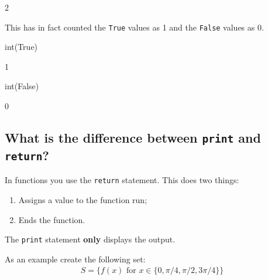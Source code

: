 \begin{raw}
2
\end{raw}





This has in fact counted the \texttt{True} values as 1 and the \texttt{False} values as 0.




\begin{pyin}
int(True)
\end{pyin}





\begin{raw}
1
\end{raw}







\begin{pyin}
int(False)
\end{pyin}





\begin{raw}
0
\end{raw}





\subsection{What is the difference between \texttt{print} and \texttt{return}?}
\label{\detokenize{tools-for-mathematics/06-probability/why/main:what-is-the-difference-between-print-and-return}}

In functions you use the \texttt{return} statement. This does two things:
\begin{enumerate}

\item 

Assigns a value to the function run;

\item 

Ends the function.

\end{enumerate}


The \texttt{print} statement \textbf{only} displays the output.


As an example create the following set:
\begin{equation*}
\begin{split}
    S = \{f(x)\text{ for }x \in \{0, \pi / 4, \pi / 2, 3\pi / 4\}\}
\end{split}
\end{equation*}

